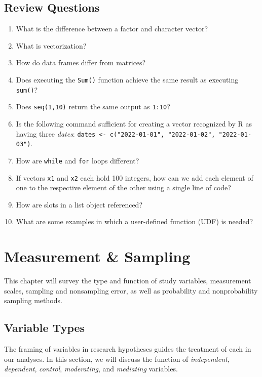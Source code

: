 \documentclass[]{book}
\begin{document}
\hypertarget{review-questions}{%
\section{Review Questions}\label{review-questions}}

\begin{enumerate}
\def\labelenumi{\arabic{enumi}.}
\item
  What is the difference between a factor and character vector?
\item
  What is vectorization?
\item
  How do data frames differ from matrices?
\item
  Does executing the \texttt{Sum()} function achieve the same result as executing \texttt{sum()}?
\item
  Does \texttt{seq(1,10)} return the same output as \texttt{1:10}?
\item
  Is the following command sufficient for creating a vector recognized by R as having three \emph{dates}: \texttt{dates\ \textless{}-\ c("2022-01-01",\ "2022-01-02",\ "2022-01-03")}.
\item
  How are \texttt{while} and \texttt{for} loops different?
\item
  If vectors \texttt{x1} and \texttt{x2} each hold 100 integers, how can we add each element of one to the respective element of the other using a single line of code?
\item
  How are slots in a list object referenced?
\item
  What are some examples in which a user-defined function (UDF) is needed?
\end{enumerate}

\hypertarget{measure-sampl}{%
\chapter{Measurement \& Sampling}\label{measure-sampl}}

This chapter will survey the type and function of study variables, measurement scales, sampling and nonsampling error, as well as probability and nonprobability sampling methods.

\hypertarget{variable-types}{%
\section{Variable Types}\label{variable-types}}

The framing of variables in research hypotheses guides the treatment of each in our analyses. In this section, we will discuss the function of \emph{independent}, \emph{dependent}, \emph{control}, \emph{moderating}, and \emph{mediating} variables.
\end{document}
